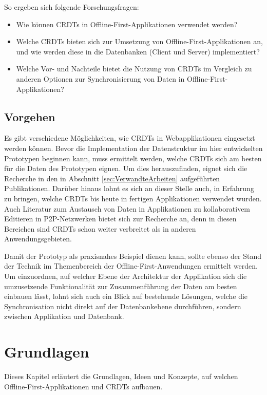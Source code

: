 \documentclass[a4paper, 12pt]{scrreprt}
\begin{document}
So ergeben sich folgende Forschungsfragen:

\begin{itemize}
	\item Wie können \acp{CRDT} in Offline-First-Applikationen verwendet werden?
	\item Welche \acp{CRDT} bieten sich zur Umsetzung von Offline-First-Applikationen an, und wie werden diese in die Datenbanken (Client und Server) implementiert?
	\item Welche Vor- und Nachteile bietet die Nutzung von \acp{CRDT} im Vergleich zu anderen Optionen zur Synchronisierung von Daten in Offline-First-Applikationen?
\end{itemize}

\section{Vorgehen}
Es gibt verschiedene Möglichkeiten, wie \acp{CRDT} in Webapplikationen eingesetzt werden können. Bevor die Implementation der Datenstruktur im hier entwickelten Prototypen beginnen kann, muss ermittelt werden, welche \acp{CRDT} sich am besten für die Daten des Prototypen eignen. Um dies herauszufinden, eignet sich die Recherche in den in Abschnitt \ref{sec:VerwandteArbeiten} aufgeführten Publikationen. Darüber hinaus lohnt es sich an dieser Stelle auch, in Erfahrung zu bringen, welche \acp{CRDT} bis heute in fertigen Applikationen verwendet wurden. Auch Literatur zum Austausch von Daten in Applikationen zu kollaborativem Editieren in \ac{P2P}-Netzwerken bietet sich zur Recherche an, denn in diesen Bereichen sind \acp{CRDT} schon weiter verbreitet als in anderen Anwendungsgebieten.

Damit der Prototyp als praxisnahes Beispiel dienen kann, sollte ebenso der Stand der Technik im Themenbereich der Offline-First-Anwendungen ermittelt werden. Um einzuordnen, auf welcher Ebene der Architektur der Applikation sich die umzusetzende Funktionalität zur Zusammenführung der Daten am besten einbauen lässt, lohnt sich auch ein Blick auf bestehende Lösungen, welche die Synchronisation nicht direkt auf der Datenbankebene durchführen, sondern zwischen Applikation und Datenbank.

\chapter{Grundlagen}
Dieses Kapitel erläutert die Grundlagen, Ideen und Konzepte, auf welchen Offline-First-Applikationen und \acp{CRDT} aufbauen. 
\end{document}
